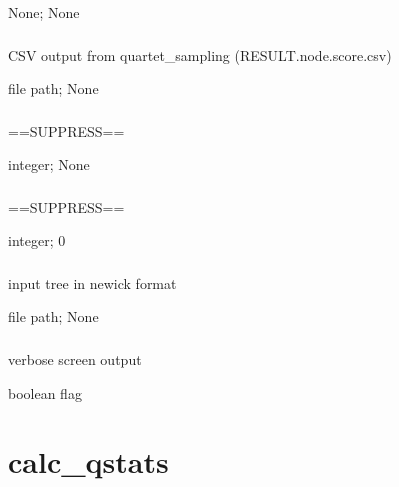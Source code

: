 \documentclass[letterpaper,12pt,english]{sphinxmanual}
\begin{document}
 None;  None


\subsubsection{}
\label{\detokenize{prog_desc:d-data}}
 CSV output from quartet\_sampling (RESULT.node.score.csv)

 file path;  None


\subsubsection{}
\label{\detokenize{prog_desc:id11}}
 ==SUPPRESS==

 integer;  None


\subsubsection{}
\label{\detokenize{prog_desc:id12}}
 ==SUPPRESS==

 integer;  0


\subsubsection{}
\label{\detokenize{prog_desc:t-tree}}
 input tree in newick format

 file path;  None


\subsubsection{}
\label{\detokenize{prog_desc:id13}}
 verbose screen output

 boolean flag


\section{calc\_qstats}
\label{\detokenize{prog_desc:calc-qstats}}
\end{document}

